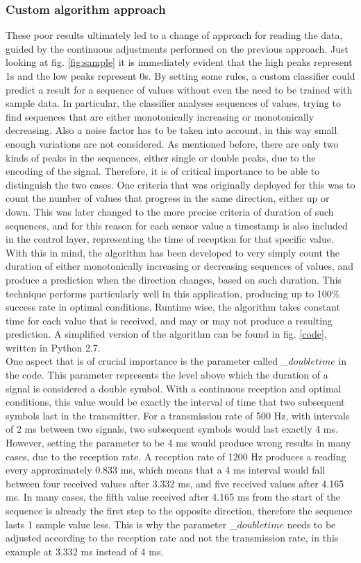 \subsubsection{Custom algorithm approach}
These poor results ultimately led to a change of approach for reading the data, guided by the continuous adjustments performed on the previous approach. 
Just looking at fig. \ref{fig:sample} it is immediately evident that the high peaks represent 1s and the low peaks represent 0s. 
By setting some rules, a custom classifier could predict a result for a sequence of values without even the need to be trained with sample data.
In particular, the classifier analyses sequences of values, trying to find sequences that are either monotonically increasing or monotonically decreasing.
Also a noise factor has to be taken into account, in this way small enough variations are not considered.
As mentioned before, there are only two kinds of peaks in the sequences, either single or double peaks, due to the encoding of the signal.
Therefore, it is of critical importance to be able to distinguish the two cases. One criteria that was originally deployed for this was to count the number of values that progress in the same direction, either up or down. 
This was later changed to the more precise criteria of duration of such sequences, and for this reason for each sensor value a timestamp is also included in the control layer, representing the time of reception for that specific value.\\ 
With this in mind, the algorithm has been developed to very simply count the duration of either monotonically increasing or decreasing sequences of values, and produce a prediction when the direction changes, based on such duration.
This technique performs particularly well in this application, producing up to 100\% success rate in optimal conditions.
 Runtime wise, the algorithm takes constant time for each value that is received, and may or may not produce a resulting prediction.
A simplified version of the algorithm can be found in fig. \ref{code}, written in Python 2.7.\\
One aspect that is of crucial importance is the parameter called \_$doubletime$ in the code.
This parameter represents the level above which the duration of a signal is considered a double symbol.
With a continuous reception and optimal conditions, this value would be exactly the interval of time that two subsequent symbols last in the transmitter.
For a transmission rate of 500 Hz, with intervals of 2 ms between two signals, two subsequent symbols would last exactly 4 ms.
However, setting the parameter to be 4 ms would produce wrong results in many cases, due to the reception rate.
A reception rate of 1200 Hz produces a reading every approximately 0.833 ms, which means that a 4 ms interval would fall between four received values after 3.332 ms, and five received values after 4.165 ms.
In many cases, the fifth value received after 4.165 ms from the start of the sequence is already the first step to the opposite direction, therefore the sequence lasts 1 sample value less.
This is why the parameter \_$doubletime$ needs to be adjusted according to the reception rate and not the transmission rate, in this example at 3.332 ms instead of 4 ms.

